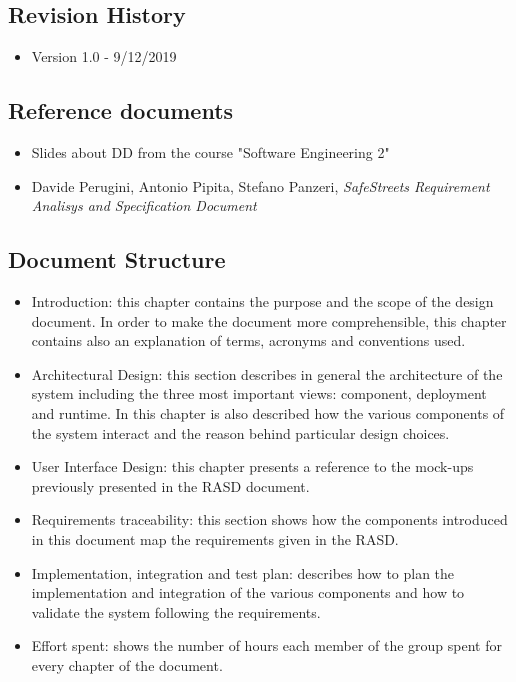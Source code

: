 \subsection{Revision History}
\begin{itemize}
	\item Version 1.0 - 9/12/2019
\end{itemize}
\subsection{Reference documents}
\begin{itemize}
	\item Slides about DD from the course "Software Engineering 2"
	\item Davide Perugini, Antonio Pipita, Stefano Panzeri, \textit{SafeStreets Requirement Analisys and Specification Document}
\end{itemize}
\subsection{Document Structure}
\begin{itemize}
	\item Introduction: this chapter contains the purpose and the scope of the design document. In order to make the document more comprehensible, this chapter contains also an explanation of terms, acronyms and conventions used.
	\item Architectural Design: this section describes in general the architecture of the system including the three most important views: component, deployment and runtime. In this chapter is also described how the various components of the system interact and the reason behind particular design choices.
	\item User Interface Design: this chapter presents a reference to the mock-ups previously presented in the RASD document.
	\item Requirements traceability: this section shows how the components introduced in this document map the requirements given in the RASD.
	\item Implementation, integration and test plan: describes how to plan the implementation and integration of the various components and how to validate the system following the requirements.
	\item Effort spent: shows the number of hours each member of the group spent for every chapter of the document.
\end{itemize}
